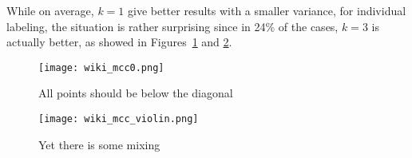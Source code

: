 \documentclass[a4paper,final,notitlepage,11pt,svgnames]{scrartcl}
\begin{document}
While on average, $k=1$ give better results with a smaller variance, for
individual labeling, the situation is rather surprising since in 24\% of the
cases, $k=3$ is actually better, as showed in Figures~\ref{fig:mcc0} and
\ref{fig:violin}.

\begin{figure}[htpb]
	\centering
	\texttt{[image: wiki\_mcc0.png]}
	\caption{All points should be below the diagonal \label{fig:mcc0}}
\end{figure}

\begin{figure}[htpb]
	\centering
	\texttt{[image: wiki\_mcc\_violin.png]}
	\caption{Yet there is some mixing \label{fig:violin}}
\end{figure}
\end{document}
